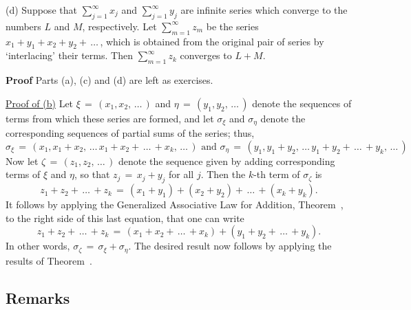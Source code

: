 \V

        (d) Suppose that $\sum_{j=1}^{{\infty}} x_{j}$ and $\sum_{j=1}^{{\infty}} y_{j}$ are infinite series which converge to the numbers $L$ and $M$, respectively.
    Let $\sum_{m=1}^{{\infty}} z_{m}$ be the series $x_{1} + y_{1} + x_{2} + y_{2} + \,{\ldots}\,$,
    which is obtained from the original pair of series by `interlacing' their terms.
    Then $\sum_{m=1}^{{\infty}} z_{k}$ converges to $L+M$.
    
\V

        {\bf Proof} Parts (a), (c) and (d) are left as exercises.


        \underline{Proof of (b)} Let ${\xi} \,=\, (x_{1},x_{2},\,{\ldots}\,)$ and ${\eta} \,=\, (y_{1},y_{2},\,{\ldots}\,)$ denote the sequences of terms from which these series are formed,
    and let ${\sigma}_{{\xi}}$ and ${\sigma}_{{\eta}}$ denote the corresponding sequences of partial sums of the series;
    thus,
        \begin{displaymath}
        {\sigma}_{{\xi}} \,=\, (x_{1},x_{1}+x_{2},\,{\ldots}\,x_{1}+x_{2}+\,{\ldots}\,+x_{k},\,{\ldots}\,) \mbox{ and }
        {\sigma}_{{\eta}} \,=\, (y_{1},y_{1}+y_{2},\,{\ldots}\,y_{1}+y_{2}+\,{\ldots}\,+y_{k},\,{\ldots}\,) 
        \end{displaymath}
    Now let ${\zeta} \,=\, (z_{1},z_{2},\,{\ldots}\,)$ denote the sequence given by adding corresponding terms of ${\xi}$ and ${\eta}$,
    so that $z_{j} \,=\, x_{j}+y_{j}$ for all $j$.
    Then the $k$-th term of ${\sigma}_{{\zeta}}$ is
        \begin{displaymath}
        z_{1}+z_{2}+\,{\ldots}\,+z_{k} \,=\, (x_{1}+y_{1}) + (x_{2}+y_{2}) + \,{\ldots}\,+ (x_{k}+y_{k}).
        \end{displaymath}
    It follows by applying the Generalized Associative Law for Addition, Theorem~, to the right side of this last equation,
    that one can write
        \begin{displaymath}
        z_{1}+z_{2}+\,{\ldots}\,+z_{k} \,=\, (x_{1} + x_{2} +\,{\ldots}\,+ x_{k}) + (y_{1} + y_{2} + \,{\ldots}\, + y_{k}).
        \end{displaymath}
    In other words, ${\sigma}_{{\zeta}} \,=\, {\sigma}_{{\xi}} + {\sigma}_{{\eta}}$.
    The  desired result now follows by applying the results of Theorem~.

\V

        \subsection{\small{{\bf Remarks}}}
        \label{RemrkG30.100}

